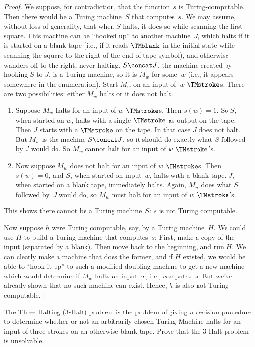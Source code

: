 \documentclass[../../../include/open-logic-section]{subfiles}
\begin{document}
\begin{proof}
We suppose, for contradiction, that the function~$s$ is
Turing-computable.  Then there would be a Turing machine~$S$ that
computes~$s$. We may assume, without loss of generality, that when $S$
halts, it does so while scanning the first square.  This machine can
be ``hooked up'' to another machine~$J$, which halts if it is started on a
blank tape (i.e., if it reads $\TMblank$ in the initial state while
scanning the square to the right of the end-of-tape symbol), and
otherwise wanders off to the right, never halting. $S \concat J$, the
machine created by hooking $S$ to $J$, is a Turing machine, so it is
$M_w$ for some~$w$ (i.e., it appears somewhere in the enumeration). Start $M_w$
on an input of~$w$ $\TMstroke$s. There are two possibilities: either
$M_w$ halts or it does not halt.
\begin{enumerate}
\item Suppose $M_w$ halts for an input of $w$ $\TMstroke$s. Then $s(w)
  = 1$. So $S$, when started on $w$, halts with a single $\TMstroke$
  as output on the tape.  Then $J$ starts with a $\TMstroke$ on the
  tape. In that case $J$ does not halt. But $M_w$ is the machine $S
  \concat J$, so it should do exactly what $S$ followed by $J$ would
  do.  So $M_w$ cannot halt for an input of $w$ $\TMstroke$'s.

\item Now suppose $M_w$ does not halt for an input of $w$
  $\TMstroke$s.  Then $s(w) = 0$, and $S$, when started on input~$w$,
  halts with a blank tape.  $J$, when started on a blank tape,
  immediately halts.  Again, $M_w$ does what $S$ followed by~$J$ would
  do, so $M_w$ must halt for an input of $w$ $\TMstroke$'s.
\end{enumerate}
This shows there cannot be a Turing machine~$S$: $s$ is not Turing
computable.

Now suppose $h$ were Turing computable, say, by a Turing machine~$H$.
We could use $H$ to build a Turing machine that computes~$s$: First,
make a copy of the input (separated by a blank). Then move back to the
beginning, and run $H$.  We can clearly make a machine that does the
former, and if $H$ existed, we would be able to ``hook it up'' to such
a modified doubling machine to get a new machine which would determine
if $M_w$ halts on input~$w$, i.e., computes~$s$. But we've already
shown that no such machine can exist. Hence, $h$ is also not Turing
computable.
\end{proof}

\begin{prob}
The Three Halting (3-Halt) problem is the problem of giving a decision
procedure to determine whether or not an arbitrarily chosen Turing
Machine halts for an input of three strokes on an otherwise blank
tape. Prove that the 3-Halt problem is unsolvable.
\end{prob}
\end{document}
